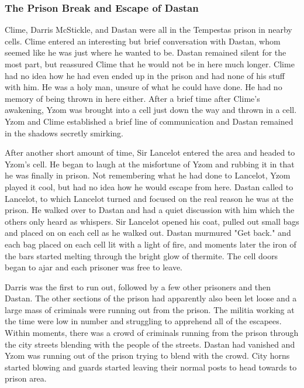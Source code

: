 \subsubsection{The Prison Break and Escape of Dastan} 

Clime, Darris McStickle, and Dastan were all in the Tempestas prison in nearby cells. Clime entered an interesting but brief conversation with Dastan, whom seemed like he was just where he wanted to be. Dastan remained silent for the most part, but reassured Clime that he would not be in here much longer. Clime had no idea how he had even ended up in the prison and had none of his stuff with him. He was a holy man, unsure of what he could have done. He had no memory of being thrown in here either. After a brief time after Clime's awakening, Yzom was brought into a cell just down the way and thrown in a cell. Yzom and Clime established a brief line of communication and Dastan remained in the shadows secretly smirking. 

After another short amount of time, Sir Lancelot entered the area and headed to Yzom's cell. He began to laugh at the misfortune of Yzom and rubbing it in that he was finally in prison. Not remembering what he had done to Lancelot, Yzom played it cool, but had no idea how he would escape from here. Dastan called to Lancelot, to which Lancelot turned and focused on the real reason he was at the prison. He walked over to Dastan and had a quiet discussion with him which the others only heard as whispers. Sir Lancelot opened his coat, pulled out small bags and placed on on each cell as he walked out. Dastan murmured "Get back." and each bag placed on each cell lit with a light of fire, and moments later the iron of the bars started melting through the bright glow of thermite. The cell doors began to ajar and each prisoner was free to leave.

Darris was the first to run out, followed by a few other prisoners and then Dastan. The other sections of the prison had apparently also been let loose and a large mass of criminals were running out from the prison. The militia working at the time were low in number and struggling to apprehend all of the escapees. Within moments, there was a crowd of criminals running from the prison through the city streets blending with the people of the streets. Dastan had vanished and Yzom was running out of the prison trying to blend with the crowd. City horns started blowing and guards started leaving their normal posts to head towards to prison area.

